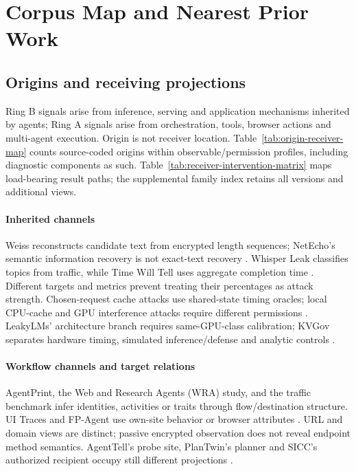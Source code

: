 \section{Corpus Map and Nearest Prior Work}\label{sec:corpus-map}
\subsection{Origins and receiving projections}
Ring B signals arise from inference, serving and application mechanisms inherited by agents; Ring A signals arise from orchestration, tools, browser actions and multi-agent execution. Origin is not receiver location. Table~\ref{tab:origin-receiver-map} counts source-coded origins within observable/permission profiles, including diagnostic components as such. Table~\ref{tab:receiver-intervention-matrix} maps load-bearing result paths; the supplemental family index retains all versions and additional views.


\paragraph{Inherited channels}
Weiss reconstructs candidate text from encrypted length sequences; NetEcho's semantic information recovery is not exact-text recovery \cite{weiss2024prompt,netecho2025}. Whisper Leak classifies topics from traffic, while Time Will Tell uses aggregate completion time \cite{whisperleak2025,timewilltell2024}. Different targets and metrics prevent treating their percentages as attack strength. Chosen-request cache attacks use shared-state timing oracles; local CPU-cache and GPU interference attacks require different permissions \cite{promptpeek2025,earlybird2025,inputsnatch2024,spliceleak2026,spillbeans2025,gu2026behindbars}. LeakyLMs' architecture branch requires same-GPU-class calibration; KVGov separates hardware timing, simulated inference/defense and analytic controls \cite{majidi2026leakylms,addagada2026kvgov}.

\paragraph{Workflow channels and target relations}
AgentPrint, the Web and Research Agents (WRA) study, and the traffic benchmark infer identities, activities or traits through flow/destination structure. UI Traces and FP-Agent use own-site behavior or browser attributes \cite{agentprint2025,jeong2026wra,pouryousef2026traffic,uitraces2026,wang2026fpagent}. URL and domain views are distinct; passive encrypted observation does not reveal endpoint method semantics. AgentTell's probe site, PlanTwin's planner and SICC's authorized recipient occupy still different projections \cite{shahriar2026agenttell,yu2026plantwin,xu2026sicc}.


